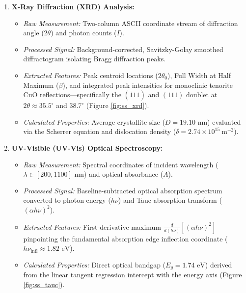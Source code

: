 \documentclass[12pt,a4paper,oneside]{report}
\begin{document}
{{{\begin{enumerate}
    \item \textbf{X-Ray Diffraction (XRD) Analysis:}
    \begin{itemize}
        \item \textit{Raw Measurement:} Two-column ASCII coordinate stream of diffraction angle ($2\theta$) and photon counts ($I$).
        \item \textit{Processed Signal:} Background-corrected, Savitzky-Golay smoothed diffractogram isolating Bragg diffraction peaks.
        \item \textit{Extracted Features:} Peak centroid locations ($2\theta_0$), Full Width at Half Maximum ($\beta$), and integrated peak intensities for monoclinic tenorite $\text{CuO}$ reflections—specifically the $(\bar{1}11)$ and $(111)$ doublet at $2\theta \approx 35.5^\circ$ and $38.7^\circ$ (Figure \ref{fig:ss_xrd}).
        \item \textit{Calculated Properties:} Average crystallite size ($D = 19.10\text{ nm}$) evaluated via the Scherrer equation and dislocation density ($\delta = 2.74 \times 10^{15}\ \text{m}^{-2}$).
    \end{itemize}

    \item \textbf{UV-Visible (UV-Vis) Optical Spectroscopy:}
    \begin{itemize}
        \item \textit{Raw Measurement:} Spectral coordinates of incident wavelength ($\lambda \in [200, 1100]\text{ nm}$) and optical absorbance ($A$).
        \item \textit{Processed Signal:} Baseline-subtracted optical absorption spectrum converted to photon energy ($h\nu$) and Tauc absorption transform ($(\alpha h\nu)^2$).
        \item \textit{Extracted Features:} First-derivative maximum $\frac{d}{d(h\nu)}[(\alpha h\nu)^2]$ pinpointing the fundamental absorption edge inflection coordinate ($h\nu_{\text{infl}} \approx 1.82\text{ eV}$).
        \item \textit{Calculated Properties:} Direct optical bandgap ($E_g = 1.74\text{ eV}$) derived from the linear tangent regression intercept with the energy axis (Figure \ref{fig:ss_tauc}).
    \end{itemize}


\end{enumerate}}}}
\end{document}
